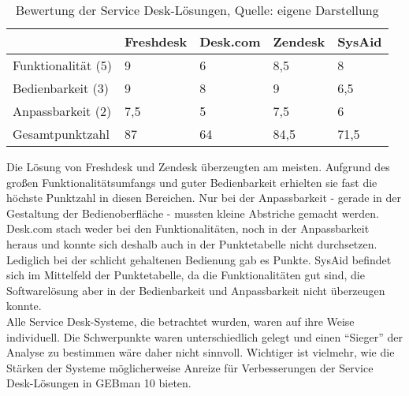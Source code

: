 \begin{table}[h!]
    \begin{tabular}{ | p{3.5cm}| p{2.5cm} | p{2.5cm} | p{2.5cm} | p{2.5cm} |}
    \hline
       & Freshdesk & Desk.com & Zendesk & SysAid \\ \hline
   Funktionalität (5) & 9 & 6 & 8,5 & 8 \\ \hline
   Bedienbarkeit (3) & 9 & 8 & 9 & 6,5 \\ \hline
   Anpassbarkeit (2) & 7,5 & 5 & 7,5 & 6 \\ \hline
   Gesamtpunktzahl & 87 & 64 & 84,5 & 71,5 \\ \hline
    \end{tabular}
    \caption[Bewertung der Service Desk-Lösungen]{Bewertung der Service Desk-Lösungen, Quelle: eigene Darstellung}
    \label{tab:Auswertung}
\end{table}

\noindent
Die Lösung von Freshdesk und Zendesk überzeugten am meisten. Aufgrund des großen Funktionalitätsumfangs und guter Bedienbarkeit erhielten sie fast die höchste Punktzahl in diesen Bereichen. Nur bei der Anpassbarkeit - gerade in der Gestaltung der Bedienoberfläche - mussten kleine Abstriche gemacht werden.\newline
Desk.com stach weder bei den Funktionalitäten, noch in der Anpassbarkeit heraus und konnte sich deshalb auch in der Punktetabelle nicht durchsetzen. Lediglich bei der schlicht gehaltenen Bedienung gab es Punkte.\newline
SysAid befindet sich im Mittelfeld der Punktetabelle, da die Funktionalitäten gut sind, die Softwarelösung aber in der Bedienbarkeit und Anpassbarkeit nicht überzeugen konnte.\\


\noindent
Alle Service Desk-Systeme, die betrachtet wurden, waren auf ihre Weise individuell. Die Schwerpunkte waren unterschiedlich gelegt und einen \enquote{Sieger} der Analyse zu bestimmen wäre daher nicht sinnvoll. Wichtiger ist vielmehr, wie die Stärken der Systeme möglicherweise Anreize für Verbesserungen der Service Desk-Lösungen in GEBman 10 bieten.\\

